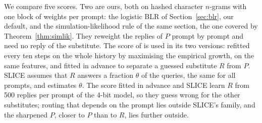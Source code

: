\documentclass[12pt]{article}
\theoremstyle{remark}
\begin{document}
We compare five scores. Two are ours, both on hashed character $n$-grams
with one block of weights per prompt: the logistic BLR of
Section~\ref{sec:blr}, our default, and the simulation-likelihood rule of the
same section, the one covered by Theorem~\ref{thm:simlik}. They reweight the
replies of $P$ prompt by prompt and need no reply of the substitute. The score
of \citet{forre2026anytime} is used in its two versions: refitted every ten
steps on the whole history by maximising the empirical growth, on the same
features, and fitted in advance to separate a guessed substitute $R$ from
$P$. SLICE assumes that $R$ answers a fraction $\theta$ of the queries, the
same for all prompts, and estimates $\theta$. The score fitted in advance and SLICE learn $R$ from 500 replies per prompt of the 4-bit model, so they guess wrong for the other substitutes; routing that depends on the prompt lies outside SLICE's family, and the sharpened $P$, closer to $P$ than to $R$, lies further outside.
\end{document}
